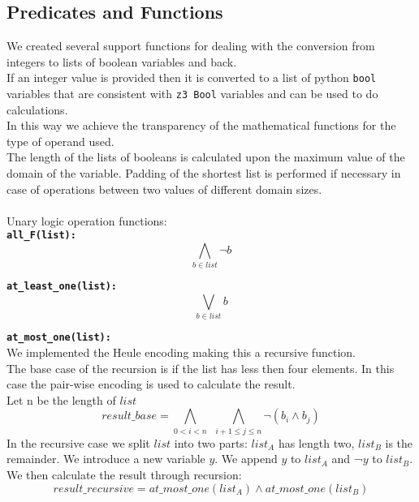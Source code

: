 
\subsection{Predicates and Functions}\label{subsec:predicates}
We created several support functions for dealing with the conversion from integers to lists of
boolean variables and back.\\
If an integer value is provided then it is converted to a list of python \texttt{bool} variables
that are consistent with 
\texttt{z3 Bool} variables and can be used to do calculations.\\
In this way we achieve the transparency of the mathematical functions for the type of operand 
used.\\
The length of the lists of booleans is calculated upon the maximum value of the domain of the
variable. Padding of the shortest list is performed if necessary in case of operations between
 two values of different domain sizes.
\\\\
Unary logic operation functions:\\
\texttt{\textbf{all\_F(list):}} 
\begin{equation}
    \bigwedge\limits_{b \in list}\neg b
\end{equation}

\texttt{\textbf{at\_least\_one(list):}}
\begin{equation}
        \bigvee\limits_{b \in list} b
\end{equation}

\texttt{\textbf{at\_most\_one(list):}}\\
We implemented the Heule encoding making this a recursive function.\\
The base case of the recursion is if the list has less then four elements. In this case the 
pair-wise encoding is used to calculate the result.\\
Let n be the length of $list$
\begin{equation}
        result\_base = \bigwedge\limits_{0 < i < n} \ \ \bigwedge\limits_{i+1 \leq j \leq n}\neg (b_i \wedge b_j)
\end{equation}
In the recursive case we split $list$ into two parts: $list_A$ has length two, $list_B$ is
 the remainder. We introduce a new variable $y$. We append $y$ to $list_A$ and ¬$y$ to 
 $list_B$. We then calculate the result through recursion:
\begin{equation}
    result\_recursive = at\_most\_one(list_A) \wedge at\_most\_one(list_B)
\end{equation}

